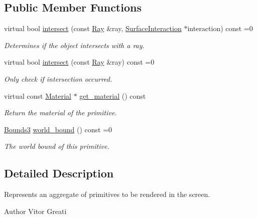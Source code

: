 \subsection*{Public Member Functions}
\begin{DoxyCompactItemize}
\item 
virtual bool \mbox{\hyperlink{classomg_1_1_aggregate_primitive_a07ab041d9071295e4f648475c7163470}{intersect}} (const \mbox{\hyperlink{classomg_1_1_ray}{Ray}} \&ray, \mbox{\hyperlink{classomg_1_1_surface_interaction}{Surface\+Interaction}} $\ast$interaction) const =0
\begin{DoxyCompactList}\small\item\em Determines if the object intersects with a ray. \end{DoxyCompactList}\item 
virtual bool \mbox{\hyperlink{classomg_1_1_aggregate_primitive_af6009e1c54b0f2341d78d95afb4268cc}{intersect}} (const \mbox{\hyperlink{classomg_1_1_ray}{Ray}} \&ray) const =0
\begin{DoxyCompactList}\small\item\em Only check if intersection occurred. \end{DoxyCompactList}\item 
virtual const \mbox{\hyperlink{classomg_1_1_material}{Material}} $\ast$ \mbox{\hyperlink{classomg_1_1_aggregate_primitive_a339e9fe3ab8e2c0c68c888345b834c21}{get\+\_\+material}} () const
\begin{DoxyCompactList}\small\item\em Return the material of the primitive. \end{DoxyCompactList}\item 
\mbox{\hyperlink{classomg_1_1_bounds3}{Bounds3}} \mbox{\hyperlink{classomg_1_1_aggregate_primitive_ad8a385aaa01354acffad18fe8f23fa25}{world\+\_\+bound}} () const =0
\begin{DoxyCompactList}\small\item\em The world bound of this primitive. \end{DoxyCompactList}\end{DoxyCompactItemize}


\subsection{Detailed Description}
Represents an aggregate of primitives to be rendered in the screen. 

\begin{DoxyAuthor}{Author}
Vitor Greati 
\end{DoxyAuthor}


